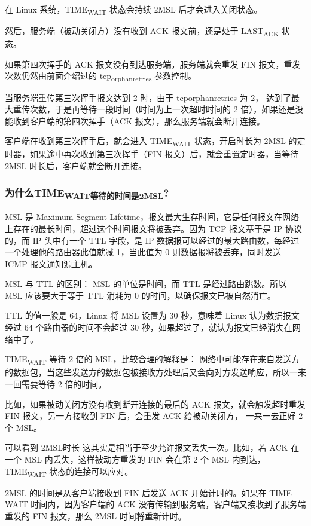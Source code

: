 \documentclass[11pt]{article}
\begin{document}
在 Linux 系统，TIME\textsubscript{WAIT} 状态会持续 2MSL 后才会进入关闭状态。

然后，服务端（被动关闭方）没有收到 ACK 报文前，还是处于 LAST\textsubscript{ACK} 状态。

如果第四次挥手的 ACK 报文没有到达服务端，服务端就会重发 FIN 报文，重发次数仍然由前面介绍过的 tcp\textsubscript{orphan}\textsubscript{retries} 参数控制。

当服务端重传第三次挥手报文达到 2 时，由于 tcporphanretries 为 2， 达到了最大重传次数，于是再等待一段时间（时间为上一次超时时间的 2 倍），如果还是没能收到客户端的第四次挥手（ACK 报文），那么服务端就会断开连接。

客户端在收到第三次挥手后，就会进入 TIME\textsubscript{WAIT} 状态，开启时长为 2MSL 的定时器，如果途中再次收到第三次挥手（FIN 报文）后，就会重置定时器，当等待 2MSL 时长后，客户端就会断开连接。
\subsubsection{为什么TIME\textsubscript{WAIT等待的时间是2MSL}?}
\label{sec:org3a28e7b}
MSL 是 Maximum Segment Lifetime，报文最大生存时间，它是任何报文在网络上存在的最长时间，超过这个时间报文将被丢弃。因为 TCP 报文基于是 IP 协议的，而 IP 头中有一个 TTL 字段，是 IP 数据报可以经过的最大路由数，每经过一个处理他的路由器此值就减 1，当此值为 0 则数据报将被丢弃，同时发送 ICMP 报文通知源主机。

MSL 与 TTL 的区别： MSL 的单位是时间，而 TTL 是经过路由跳数。所以 MSL 应该要大于等于 TTL 消耗为 0 的时间，以确保报文已被自然消亡。

TTL 的值一般是 64，Linux 将 MSL 设置为 30 秒，意味着 Linux 认为数据报文经过 64 个路由器的时间不会超过 30 秒，如果超过了，就认为报文已经消失在网络中了。

TIME\textsubscript{WAIT} 等待 2 倍的 MSL，比较合理的解释是： 网络中可能存在来自发送方的数据包，当这些发送方的数据包被接收方处理后又会向对方发送响应，所以一来一回需要等待 2 倍的时间。

比如，如果被动关闭方没有收到断开连接的最后的 ACK 报文，就会触发超时重发 FIN 报文，另一方接收到 FIN 后，会重发 ACK 给被动关闭方， 一来一去正好 2 个 MSL。

可以看到 2MSL时长 这其实是相当于至少允许报文丢失一次。比如，若 ACK 在一个 MSL 内丢失，这样被动方重发的 FIN 会在第 2 个 MSL 内到达，TIME\textsubscript{WAIT} 状态的连接可以应对。

2MSL 的时间是从客户端接收到 FIN 后发送 ACK 开始计时的。如果在 TIME-WAIT 时间内，因为客户端的 ACK 没有传输到服务端，客户端又接收到了服务端重发的 FIN 报文，那么 2MSL 时间将重新计时。
\end{document}

